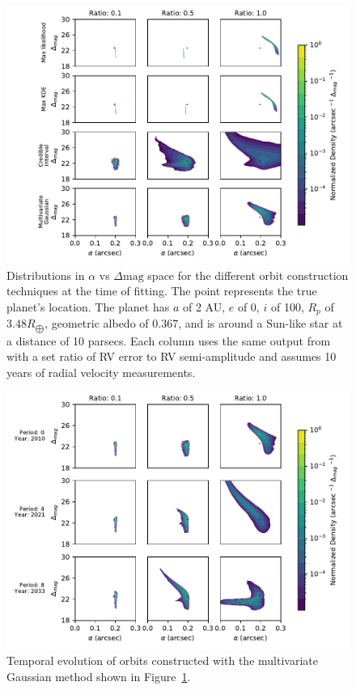 \begin{figure}[hpt]
    \centering
    \includegraphics[width=\linewidth]{ch1/figures/construction_method_vs_error_100.pdf}
    \caption{Distributions in $\alpha $ vs $\Delta\mathrm{mag}$ space for the different orbit construction
    techniques at the time of fitting. The point represents the true planet's location. The planet
    has $a$ of 2 AU, $e$ of 0, $i$ of 100\degree, $R_p$ of $3.48 R_{\bigoplus}$, geometric
    albedo of 0.367, and is around a Sun-like star at a distance of 10 parsecs. Each column uses the
    same output from  with a set ratio of RV error to RV semi-amplitude and assumes 10
    years of radial velocity measurements.}%
    \label{fig:construction_method_pdfs}
\end{figure}
\begin{figure}[htpb]
    \centering
    \includegraphics[width=\linewidth]{ch1/figures/dispersion_in_time_i100.pdf}
    \caption{Temporal evolution of orbits constructed with the multivariate Gaussian method shown in
    Figure~\ref{fig:construction_method_pdfs}.}%
    \label{fig:dispersion_in_time}
\end{figure}
